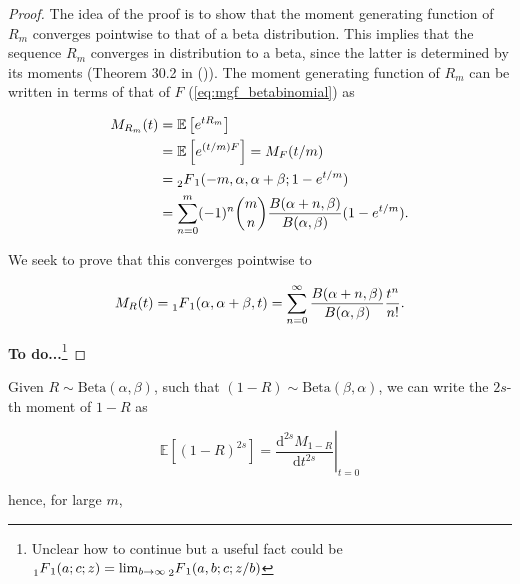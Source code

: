 \documentclass[american, abstract=on]{scrartcl}
\theoremstyle{plain}
\newcommand{\E}{\mathbb{E}}
\newcommand{\Beta}{\text{Beta}}
\newcommand{\citein}[1]{\citeauthor{#1} (\citeyear{#1})}
\begin{document}
\begin{proof}

    The idea of the proof is to show that the moment generating function of $R_m$ converges pointwise to that of a beta distribution. This implies that the sequence $R_m$ converges in distribution to a beta, since the latter is determined by its moments (Theorem 30.2 in \citein{billingsley_probability_1995}). The moment generating function of $R_m$ can be written in terms of that of $F$ (\ref{eq:mgf_betabinomial}) as 

    \begin{equation}
        \begin{split}
            M_{R_m}(t) &= \E\left[e^{t R_m}\right] \\ 
            &= \E\left[e^{(t / m) F}\right] = M_F(t / m) \\
            &= \prescript{}{2}{F}_1(-m, \alpha, \alpha + \beta; 1 - e^{t / m}) \\
            &= \sum^m_{n = 0} (-1)^n \binom{m}{n} \frac{B(\alpha + n, \beta)}{B(\alpha, \beta)} (1 - e^{t / m}).
        \end{split}
    \end{equation}

    We seek to prove that this converges pointwise to 

    \begin{equation}
        M_R(t) = \prescript{}{1}{F}_1(\alpha, \alpha + \beta, t)= \sum^{\infty}_{n = 0} \frac{B(\alpha + n, \beta)}{B(\alpha, \beta)} \frac{t^n}{n!}.
    \end{equation}

    
    \textbf{To do...}\footnote{Unclear how to continue but a useful fact could be $\prescript{}{1}{F}_1(a; c; z) = \lim_{b \rightarrow \infty} \prescript{}{2}{F}_1(a, b; c; z / b)$}

\end{proof}

Given $R \sim \Beta(\alpha, \beta)$, such that $(1 - R) \sim \Beta(\beta, \alpha)$, we can write the $2s$-th moment of $1 - R$ as 

\begin{equation}
    \E[(1 - R)^{2s}] =  \left.\frac{\text{d}^{2s} M_{1 - R}}{\text{d}t^{2s}}\right\rvert_{t = 0} 
\end{equation}

hence, for large $m$,
\end{document}
